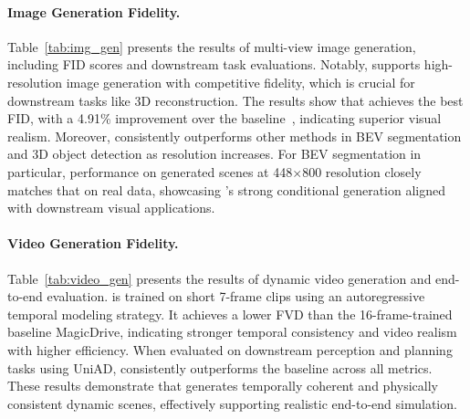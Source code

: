 

\vspace{-1mm}

\paragraph{Image Generation Fidelity.}
Table~\ref{tab:img_gen} presents the results of multi-view image generation, including FID scores and downstream task evaluations. Notably, {\method} supports high-resolution image generation with competitive fidelity, which is crucial for downstream tasks like 3D reconstruction. The results show that {\method} achieves the best FID, with a 4.91\% improvement over the baseline~\cite{MagicDrive}, indicating superior visual realism. Moreover, {\method} consistently outperforms other methods in BEV segmentation and 3D object detection as resolution increases. For BEV segmentation in particular, performance on generated scenes at 448$\times$800 resolution closely matches that on real data, showcasing {\method}'s strong conditional generation aligned with downstream visual applications.

\paragraph{Video Generation Fidelity.}
\label{sec:video}
Table~\ref{tab:video_gen} presents the results of dynamic video generation and end-to-end evaluation. {\method} is trained on short 7-frame clips using an autoregressive temporal modeling strategy. It achieves a lower FVD than the 16-frame-trained baseline MagicDrive, indicating stronger temporal consistency and video realism with higher efficiency. When evaluated on downstream perception and planning tasks using UniAD, {\method} consistently outperforms the baseline across all metrics. These results demonstrate that {\method} generates temporally coherent and physically consistent dynamic scenes, effectively supporting realistic end-to-end simulation.





